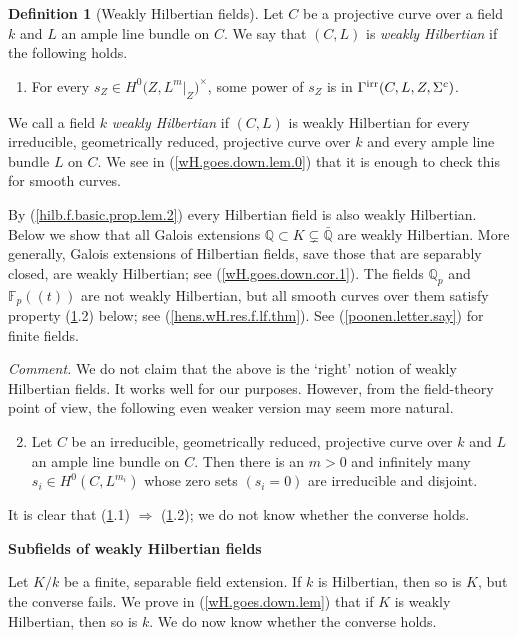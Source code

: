 \documentclass{amsart}
\theoremstyle{definition}
\newtheorem{defn}[thm]{Definition}
\theoremstyle{remark}
\newcommand{\f}[0]{{\mathbb F}}
\newcommand{\q}[0]{{\mathbb Q}}
\begin{document}
\begin{defn}[Weakly Hilbertian fields]\label{weak.hilb.say}
Let $C$ be a projective curve over  a field $k$ and $L$ an ample line bundle on $C$. We say that $(C, L)$ is {\it weakly Hilbertian}
if the following holds.
\begin{enumerate}
\item  For every    $s_Z\in H^0\bigl(Z, L^m|_Z\bigr)^\times$,
some power of $s_Z$ is in $\Gamma^{\rm irr}(C,L, Z, \Sigma^c)$. 
\end{enumerate}
  We call a field $k$ 
{\it weakly Hilbertian} if $(C, L)$ is  weakly Hilbertian
for every  irreducible,  geometrically reduced,  projective curve  over  $k$ and every ample line bundle $L$ on $C$.
We see in (\ref{wH.goes.down.lem.0}) that it is enough to check this for 
smooth curves.

By (\ref{hilb.f.basic.prop.lem.2})
every  Hilbertian field  is also  weakly Hilbertian. 
Below we show that all   Galois extensions  $\q\subset K\subsetneq \bar\q$ are  weakly Hilbertian. More generally,  Galois extensions of Hilbertian fields, save those that are separably closed, are  weakly Hilbertian; see (\ref{wH.goes.down.cor.1}). The fields $\q_p$ and $\f_p((t))$  are not weakly Hilbertian, but all smooth curves over them satisfy property (\ref{weak.hilb.say}.2) below; see (\ref{hens.wH.res.f.lf.thm}). 
See (\ref{poonen.letter.say}) for finite fields. 



{\it Comment.} We do not claim that the above  is the `right' notion of weakly Hilbertian fields. It works well for our purposes. However, from the  field-theory point of view, the following even weaker version may seem more natural.
\begin{enumerate}\setcounter{enumi}{1}
\item Let $C$ be an irreducible,  geometrically reduced,  projective curve over $k$ and  $L$ an ample line bundle on $C$. Then there is an $m>0$ and infinitely many $s_i\in H^0(C, L^{m_i})$ whose zero sets  $(s_i=0)$ are irreducible and disjoint. 
\end{enumerate}
It is clear that  (\ref{weak.hilb.say}.1) $\Rightarrow$ (\ref{weak.hilb.say}.2); we do not know whether the converse holds.
\end{defn}




\medskip
{\bf Subfields of weakly Hilbertian fields}
\medskip


Let $K/k$ be a  finite, separable field extension. If $k$ is Hilbertian, then so is $K$, but the converse fails. We prove in
(\ref{wH.goes.down.lem}) that if $K$  is weakly Hilbertian, then so is $k$.
We do now know whether the converse holds.
\end{document}
